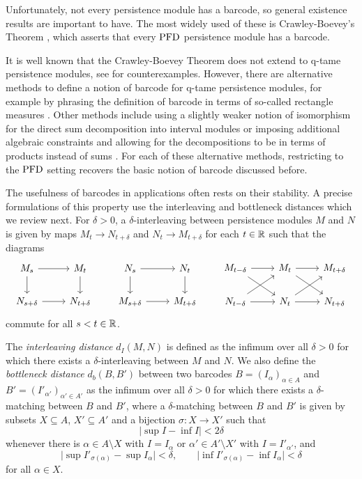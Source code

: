 Unfortunately, not every persistence module has a barcode, so general existence results are important to have. The most widely used of these is Crawley-Boevey's Theorem \cite{Crawley-Boevey.2015}, which asserts that every $\mathrm{PFD}$ persistence module has a barcode. 

It is well known that the Crawley-Boevey Theorem does not extend to q-tame persistence modules, see \cite{Chazal.2016a} for counterexamples.
However, there are alternative methods to define a notion of barcode for q-tame persistence modules, for example by phrasing the definition of barcode in terms of so-called rectangle measures \cite{Chazal.2016a}.
Other methods include using a slightly weaker notion of isomorphism for the direct sum decomposition into interval modules \cite{Chazal.2016b} or imposing additional algebraic constraints and allowing for the decompositions to be in terms of products instead of sums \cite{schmahl2020structure}.
For each of these alternative methods, restricting to the $\mathrm{PFD}$ setting recovers the basic notion of barcode discussed before.

The usefulness of barcodes in applications often rests on their stability.
A precise formulations of this property use the interleaving and bottleneck distances which we review next.
For $\delta > 0$, a $\delta$-interleaving between persistence modules $M$ and $N$ is given by maps $M_{t} \to N_{t+\delta}$ and $N_{t}\to M_{t+\delta}$ for each $t \in \mathbb{R}$ such that the diagrams
\[
\begin{tikzcd}
M_s\arrow[r]\arrow[d] & M_t\arrow[d] \\
N_{s+\delta}\arrow[r] & N_{t+\delta}
\end{tikzcd}
\qquad
\begin{tikzcd}
N_s\arrow[r]\arrow[d] & N_t\arrow[d] \\
M_{s+\delta}\arrow[r] & M_{t+\delta}
\end{tikzcd}
\qquad
\begin{tikzcd}
M_{t-\delta}\arrow[rd]\arrow[r]& M_{t}\arrow[rd]\arrow[r] & M_{t+\delta} \\
N_{t-\delta}\arrow[ru]\arrow[r]& N_{t}\arrow[ru]\arrow[r] & N_{t+\delta}
\end{tikzcd}
\]
commute for all $s < t \in \mathbb{R}$.

The \textit{interleaving distance} $d_{I}(M,N)$ is defined as the infimum over all $\delta > 0$ for which there exists a $\delta$-interleaving between $M$ and $N$.
We also define the \emph{bottleneck distance} $d_{b}(B,B')$ between two barcodes $B = (I_{\alpha})_{\alpha\in A}$ and $B' = (I'_{\alpha'})_{\alpha'\in A'}$ as the infimum over all $\delta > 0$ for which there exists a $\delta$-matching between $B$ and $B'$, where a $\delta$-matching between $B$ and $B'$ is given by subsets $X\subseteq A$, $X'\subseteq A'$ and a bijection $\sigma\colon X\to X'$ such that
\[
\lvert \sup I - \inf I \rvert < 2\delta
\]
whenever there is $\alpha\in A\setminus X$ with $I=I_{\alpha}$ or $\alpha'\in A'\setminus X'$ with $I=I'_{\alpha'}$, and
\begin{equation*}
\lvert \sup I'_{\sigma(\alpha)} - \sup I_{\alpha} \rvert < \delta, \qquad
\lvert \inf I'_{\sigma(\alpha)} - \inf I_{\alpha} \rvert < \delta
\end{equation*}
for all $\alpha\in X$.

